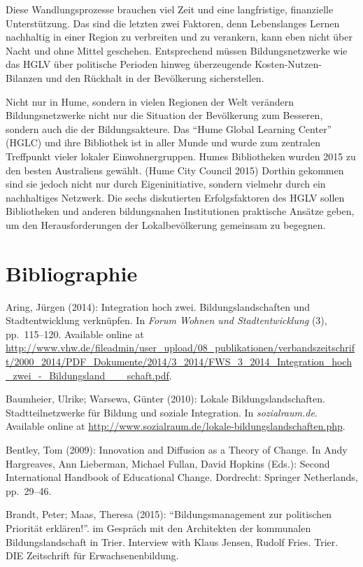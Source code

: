 \documentclass[a4paper,
fontsize=11pt,
oneside,
numbers=noperiodatend,
parskip=half-,
bibliography=totoc,
final
]{scrartcl}
\begin{document}
Diese Wandlungsprozesse brauchen viel Zeit und eine langfristige,
finanzielle Unterstützung. Das sind die letzten zwei Faktoren, denn
Lebenslanges Lernen nachhaltig in einer Region zu verbreiten und zu
verankern, kann eben nicht über Nacht und ohne Mittel geschehen.
Entsprechend müssen Bildungsnetzwerke wie das HGLV über politische
Perioden hinweg überzeugende Kosten-Nutzen-Bilanzen und den Rückhalt in
der Bevölkerung sicherstellen.

Nicht nur in Hume, sondern in vielen Regionen der Welt verändern
Bildungsnetzwerke nicht nur die Situation der Bevölkerung zum Besseren,
sondern auch die der Bildungsakteure. Das \enquote{Hume Global Learning
Center} (HGLC) und ihre Bibliothek ist in aller Munde und wurde zum
zentralen Treffpunkt vieler lokaler Einwohnergruppen. Humes Bibliotheken
wurden 2015 zu den besten Australiens gewählt. (Hume City Council 2015)
Dorthin gekommen sind sie jedoch nicht nur durch Eigeninitiative,
sondern vielmehr durch ein nachhaltiges Netzwerk. Die sechs diskutierten
Erfolgsfaktoren des HGLV sollen Bibliotheken und anderen bildungsnahen
Institutionen praktische Ansätze geben, um den Herausforderungen der
Lokalbevölkerung gemeinsam zu begegnen.

\hypertarget{bibliographie}{%
\section*{Bibliographie}\label{bibliographie}}

Aring, Jürgen (2014): Integration hoch zwei. Bildungslandschaften und
Stadtentwicklung verknüpfen. In \emph{Forum Wohnen und Stadtentwicklung}
(3), pp.~115--120. Available online at
\url{http://www.vhw.de/fileadmin/user_upload/08_publikationen/verbandszeitschrift/2000_2014/PDF_Dokumente/2014/3_2014/FWS_3_2014_Integration_hoch_zwei_-_Bildungsland___schaft.pdf}.

Baumheier, Ulrike; Warsewa, Günter (2010): Lokale Bildungslandschaften.
Stadtteilnetzwerke für Bildung und soziale Integration. In
\emph{sozialraum.de}. Available online at
\url{http://www.sozialraum.de/lokale-bildungslandschaften.php}.

Bentley, Tom (2009): Innovation and Diffusion as a Theory of Change. In
Andy Hargreaves, Ann Lieberman, Michael Fullan, David Hopkins (Eds.):
Second International Handbook of Educational Change. Dordrecht: Springer
Netherlands, pp.~29--46.

Brandt, Peter; Maas, Theresa (2015): \enquote{Bildungsmanagement zur
politischen Priorität erklären!}. im Gespräch mit den Architekten der
kommunalen Bildungslandschaft in Trier. Interview with Klaus Jensen,
Rudolf Fries. Trier. DIE Zeitschrift für Erwachsenenbildung.
\end{document}
